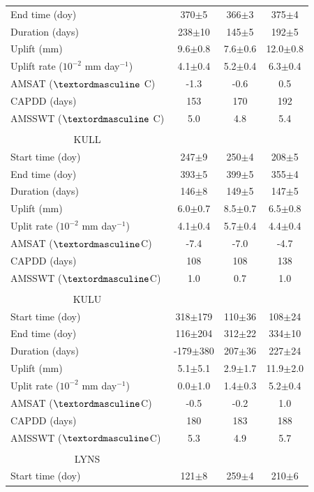 \begin{center}
\begin{ThreePartTable}
\begin{longtable}{lccc}
				End time (doy) & 370$\pm$5 & 366$\pm$3 & 375$\pm$4\\
				Duration (days) & 238$\pm$10 & 145$\pm$5 & 192$\pm$5\\
				Uplift (mm) & 9.6$\pm$0.8 & 7.6$\pm$0.6 & 12.0$\pm$0.8\\
				Uplift rate ($10^{-2}$ mm day$^{-1}$) & 4.1$\pm$0.4 & 5.2$\pm$0.4 & 6.3$\pm$0.4\\
				AMSAT ($\textordmasculine$ C) & -1.3 & -0.6 & 0.5\\
				CAPDD (days) & 153 & 170 & 192\\
				AMSSWT ($\textordmasculine$ C) & 5.0 & 4.8 & 5.4\\ 
				&  &  & \\
				\multicolumn{1}{c}{KULL} & & & \\
Start time (doy) & 247$\pm$9 & 250$\pm$4 & 208$\pm$5\\
End time (doy)&393$\pm$5&399$\pm$5&355$\pm$4\\
Duration (days)&146$\pm$8&149$\pm$5&147$\pm$5\\
Uplift (mm)&6.0$\pm$0.7&8.5$\pm$0.7&6.5$\pm$0.8\\
Uplit rate ($10^{-2}$ mm day$^{-1}$)&4.1$\pm$0.4&5.7$\pm$0.4&4.4$\pm$0.4\\
AMSAT ($\textordmasculine$C)&-7.4&-7.0&-4.7\\
CAPDD (days)&108&108&138\\
AMSSWT ($\textordmasculine$C)&1.0&0.7&1.0\\																				
				&  &  & \\	
\multicolumn{1}{c}{KULU} & & & \\
Start time (doy)&318$\pm$179&110$\pm$36&108$\pm$24\\
End time (doy)&116$\pm$204&312$\pm$22&334$\pm$10\\
Duration (days)&-179$\pm$380&207$\pm$36&227$\pm$24\\
Uplift (mm)&5.1$\pm$5.1&2.9$\pm$1.7&11.9$\pm$2.0\\
Uplit rate ($10^{-2}$ mm day$^{-1}$)&0.0$\pm$1.0&1.4$\pm$0.3&5.2$\pm$0.4\\
AMSAT ($\textordmasculine$C)&-0.5&-0.2&1.0\\
CAPDD (days)&180&183&188\\
AMSSWT ($\textordmasculine$C)&5.3&4.9&5.7\\
&  &  & \\	
\multicolumn{1}{c}{LYNS} & & & \\
Start time (doy)&121$\pm$8&259$\pm$4&210$\pm$6\\

\end{longtable}
\end{ThreePartTable}
\end{center}
